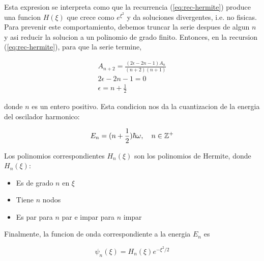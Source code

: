 \documentclass[11pt]{article}
\begin{document}
Esta expresion se interpreta como que la recurrencia (\ref{eq:rec-hermite}) produce una funcion \(H(\xi)\) que crece como \(e^{\xi^2}\) y da soluciones divergentes, i.e. no fisicas. Para prevenir este comportamiento, debemos truncar la serie despues de algun \(n\) y asi reducir la solucion a un polinomio de grado finito. Entonces, en la recursion (\ref{eq:rec-hermite}), para que la serie termine,

\begin{gather*}
      A_{n+2} = \frac{(2\epsilon - 2n -1)A_n}{(n+2)(n+1)} \\
      2\epsilon - 2n -1 = 0 \\
      \epsilon = n + \frac{1}{2}
\end{gather*}

donde \(n\) es un entero positivo. Esta condicion nos da la cuantizacion de la energia del oscilador harmonico:

\begin{equation}
\label{eq:ho-energy}
    E_n = (n+\frac{1}{2})\hbar \omega \qc n \in \mathbb{Z}^+
\end{equation}

Los polinomios correspondientes \(H_n(\xi)\) son los polinomios de Hermite, donde \(H_n(\xi)\):

\begin{itemize}
\item Es de grado \(n\) en \(\xi\)

\item Tiene \(n\) nodos

\item Es par para \(n\) par e impar para \(n\) impar
\end{itemize}

Finalmente, la funcion de onda correspondiente a la energia \(E_n\) es

\[ \psi_n(\xi) = H_n(\xi)e^{-\xi^2/2} \]
\end{document}
